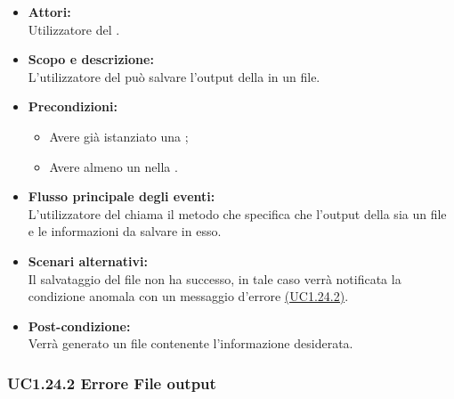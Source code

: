 \begin{itemize}
	\item \textbf{Attori:}
	\\Utilizzatore del .
	\item \textbf{Scopo e descrizione:} 
	\\L'utilizzatore del  può salvare l'output della  in un file.
	\item \textbf{Precondizioni:}
	\begin{itemize}
		\item Avere già istanziato una ;
		\item Avere almeno un  nella .
	\end{itemize}
	\item \textbf{Flusso principale degli eventi:}
	\\L'utilizzatore del  chiama il metodo che specifica che l'output della  sia un file e le informazioni da salvare in esso.
	\item \textbf{Scenari alternativi:}
	\\Il salvataggio del file non ha successo, in tale caso verrà notificata la condizione anomala con un messaggio d'errore \hyperref[UC1.24.2]{(UC1.24.2)}.
	\item \textbf{Post-condizione:}
	\\Verrà generato un file contenente l'informazione desiderata.
\end{itemize}

\subsubsection{UC1.24.2 Errore File output} \label{UC1.24.2}


